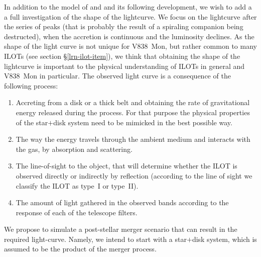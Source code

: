 \documentclass[modern]{aastex62}
\begin{document}
In addition to the model of \cite{2005A&A...436.1009T} and \cite{2006A&A...451..223T} and its following development, we wish to add a a full investigation of the shape of the lightcurve.
We focus on the lightcurve after the series of peaks (that is probably the result of a spiraling companion being destructed), when the accretion is continuous and the luminosity declines.
As the shape of the light curve is not unique for V838~Mon, but rather common to many ILOTs (see section \S \ref{lrn-ilot-item}), we think that obtaining the shape of the lightcurve is important to the physical understanding of ILOTs in general and V838~Mon in particular.
The observed light curve is a consequence of the following process:
\begin{enumerate}
    \item Accreting from a disk or a thick belt and obtaining the rate of gravitational energy released during the process. For that purpose the physical properties of the star$+$disk system need to be mimicked \citep{2005A&A...434.1107M,2005A&A...441.1099T,2006CBET..780....1M,2007ASPC..363.....C} in the best possible way.
    \item The way the energy travels through the ambient medium and interacts with the gas, by absorption and scattering.
    \item The line-of-sight to the object, that will determine whether the ILOT is observed directly or indirectly by reflection (according to the line of sight we classify the ILOT as type~I or type~II).
    \item The amount of light gathered in the observed bands according to the response of each of the telescope filters.
\end{enumerate}

We propose to simulate a post-stellar merger scenario that can result in the required light-curve. Namely, we intend to start with a star$+$disk system, which is assumed to be the product of the merger process.
\end{document}
